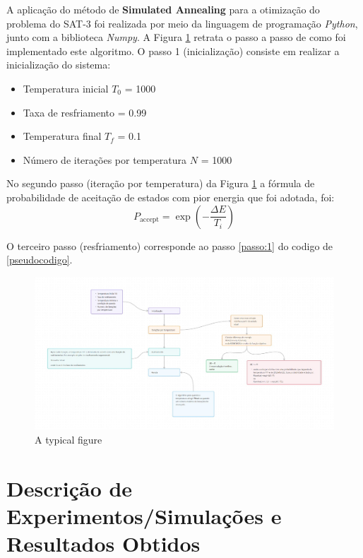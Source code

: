 \documentclass[12pt]{article}
\begin{document}
A aplicação do método de \textbf{Simulated Annealing} para a otimização do problema do SAT-3 foi realizada por meio da linguagem de programação \textit{Python}, junto com a biblioteca \textit{Numpy}.
%
A Figura \ref{fig:metodologia} retrata o passo a passo de como foi implementado este algoritmo.
%
O passo 1 (inicialização) consiste em realizar a inicialização do sistema:

\begin{itemize}
  \item Temperatura inicial $T_0$ = 1000
  \item Taxa de resfriamento \alpha = 0.99
  \item Temperatura final $T_f$ = 0.1
  \item Número de iterações por temperatura $N$ = 1000
\end{itemize}

No segundo passo (iteração por temperatura) da Figura \ref{fig:metodologia} a fórmula de probabilidade de aceitação de estados com pior energia que foi adotada, foi:
\begin{equation}
  P_{\text{accept}} = \exp\left(-\frac{\Delta E}{T_i}\right)
\end{equation}

O terceiro passo (resfriamento) corresponde ao passo \ref{passo:1} do codigo de \ref{pseudocodigo}.

\begin{figure}[H]
  \centering
  \includegraphics[width=1\textwidth]{pasta_.jpeg}
  \caption{A typical figure}
  \label{fig:metodologia}
  \end{figure}

\section{Descrição de Experimentos/Simulações e Resultados Obtidos}
\label{sec:descicao_de_experimentos_/_simulacoes_e_resultados_obtidos}
\end{document}
